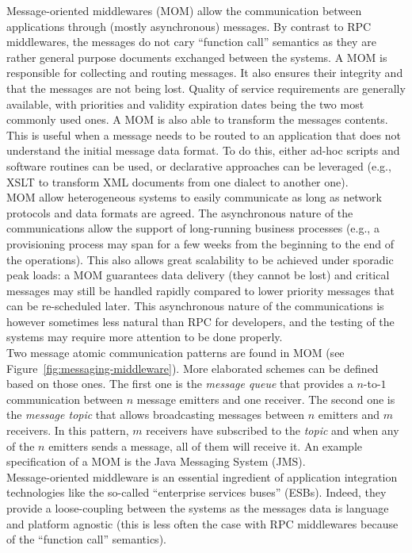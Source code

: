 Message-oriented middlewares (MOM) allow the communication between applications through (mostly asynchronous) messages. By contrast to RPC middlewares, the messages do not cary ``function call'' semantics as they are rather general purpose documents exchanged between the systems. A MOM is responsible for collecting and routing messages. It also ensures their integrity and that the messages are not being lost. Quality of service requirements are generally available, with priorities and validity expiration dates being the two most commonly used ones. A MOM is also able to transform the messages contents. This is useful when a message needs to be routed to an application that does not understand the initial message data format. To do this, either ad-hoc scripts and software routines can be used, or declarative approaches can be leveraged (e.g., XSLT to transform XML documents from one dialect to another one).\\

MOM allow heterogeneous systems to easily communicate as long as network protocols and data formats are agreed. The asynchronous nature of the communications allow the support of long-running business processes (e.g., a provisioning process may span for a few weeks from the beginning to the end of the operations). This also allows great scalability to be achieved under sporadic peak loads: a MOM guarantees data delivery (they cannot be lost) and critical messages may still be handled rapidly compared to lower priority messages that can be re-scheduled later. This asynchronous nature of the communications is however sometimes less natural than RPC for developers, and the testing of the systems may require more attention to be done properly.\\

Two message atomic communication patterns are found in MOM (see Figure~\ref{fig:messaging-middleware}). More elaborated schemes can be defined based on those ones. The first one is the \emph{message queue} that provides a $n$-to-$1$ communication between $n$ message emitters and one receiver. The second one is the \emph{message topic} that allows broadcasting messages between $n$ emitters and $m$ receivers. In this pattern, $m$ receivers have subscribed to the \emph{topic} and when any of the $n$ emitters sends a message, all of them will receive it. An example specification of a MOM is the Java Messaging System (JMS).\\

Message-oriented middleware is an essential ingredient of application integration technologies like the so-called ``enterprise services buses'' (ESBs). Indeed, they provide a loose-coupling between the systems as the messages data is language and platform agnostic (this is less often the case with RPC middlewares because of the ``function call'' semantics).\\

